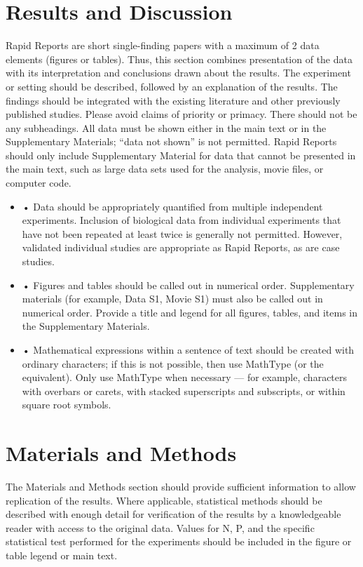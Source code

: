 \documentclass{article}
\begin{document}
\section{Results and Discussion}
Rapid Reports are short single-finding papers with a maximum of 2 data elements (figures or tables). Thus, this section combines presentation of the data with its interpretation and conclusions drawn about the results. The experiment or setting should be described, followed by an explanation of the results. The findings should be integrated with the existing literature and other previously published studies. Please avoid claims of priority or primacy.  There should not be any subheadings. All data must be shown either in the main text or in the Supplementary Materials; “data not shown” is not permitted. Rapid Reports should only include Supplementary Material for data that cannot be presented in the main text, such as large data sets used for the analysis, movie files, or computer code. 
\begin{itemize}
    \item •	Data should be appropriately quantified from multiple independent experiments. Inclusion of biological data from individual experiments that have not been repeated at least twice is generally not permitted. However, validated individual studies are appropriate as Rapid Reports, as are case studies.
    \item •	Figures and tables should be called out in numerical order. Supplementary materials (for example, Data S1, Movie S1) must also be called out in numerical order. Provide a title and legend for all figures, tables, and items in the Supplementary Materials.
    \item •	Mathematical expressions within a sentence of text should be created with ordinary characters; if this is not possible, then use MathType (or the equivalent). Only use MathType when necessary — for example, characters with overbars or carets, with stacked superscripts and subscripts, or within square root symbols.
\end{itemize}

\section{Materials and Methods}
The Materials and Methods section should provide sufficient information to allow replication of the results. Where applicable, statistical methods should be described with enough detail for verification of the results by a knowledgeable reader with access to the original data. Values for N, P, and the specific statistical test performed for the experiments should be included in the figure or table legend or main text. 
\end{document}
